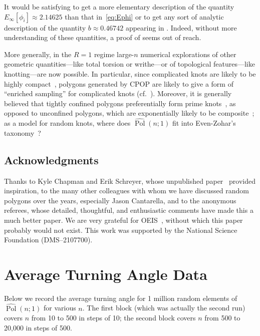 \documentclass{article}
\theoremstyle{definition}
\newcommand{\Polhat}{\widehat{\operatorname{Pol}}}
\begin{document}
It would be satisfying to get a more elementary description of the quantity $E_\infty[\phi_i] \approx 2.14625$ than that in~\eqref{eq:Ephi} or to get any sort of analytic description of the quantity $b \approx 0.46742$ appearing in . Indeed, without more understanding of these quantities, a proof of  seems out of reach. 

More generally, in the $R=1$ regime large-$n$ numerical explorations of other geometric quantities---like total torsion or writhe---or of topological features---like knotting---are now possible. In particular, since complicated knots are likely to be highly compact~\cite{diaoKnotSpectrumConfined2014,diaoRelativeFrequenciesAlternating2018,mooreTopologicallyDrivenSwelling2004,orlandiniAsymptoticsKnottedLattice1998}, polygons generated by CPOP are likely to give a form of ``enriched sampling'' for complicated knots (cf.~\cite{eddyNewStickNumber2022}). Moreover, it is generally believed that tightly confined polygons preferentially form prime knots~\cite{ernstKnottingSpectrumPolygonal2021}, as opposed to unconfined polygons, which are exponentially likely to be composite~\cite{diaoKnottingEquilateralPolygons1995}; as a model for random knots, where does $\Polhat(n;1)$ fit into Even-Zohar's taxonomy~\cite{even-zoharModelsRandomKnots2017}?

\subsection*{Acknowledgments}

Thanks to Kyle Chapman and Erik Schreyer, whose unpublished paper~\cite{chapmanOrthoschemesCoordinateSystem2019} provided inspiration, to the many other colleagues with whom we have discussed random polygons over the years, especially Jason Cantarella, and to the anonymous referees, whose detailed, thoughtful, and enthusiastic comments have made this a much better paper. We are very grateful for OEIS~\cite{oeis}, without which this paper probably would not exist. This work was supported by the National Science Foundation (DMS--2107700).

\clearpage

\appendix
\section{Average Turning Angle Data} 
\label{sec:data}

	Below we record the average turning angle for 1 million random elements of $\Polhat(n;1)$ for various $n$. The first block (which was actually the second run) covers $n$ from 10 to 500 in steps of 10; the second block covers $n$ from 500 to 20,000 in steps of 500.
\end{document}
